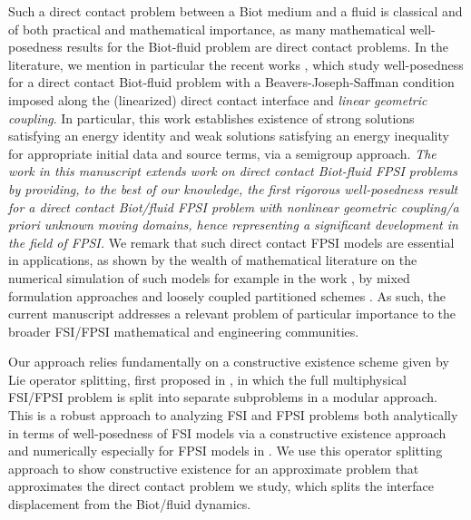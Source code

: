 \documentclass[11pt]{article}
\theoremstyle{definition}
\begin{document}
Such a direct contact problem between a Biot medium and a fluid is classical and of both practical and mathematical importance, as many mathematical well-posedness results for the Biot-fluid problem are direct contact problems. In the literature, we mention in particular the recent works \cite{Gurvich,AW25}, which study well-posedness for a direct contact Biot-fluid problem with a Beavers-Joseph-Saffman condition imposed along the (linearized) direct contact interface and \textit{linear geometric coupling}. In particular, this work establishes existence of strong solutions satisfying an energy identity and weak solutions satisfying an energy inequality for appropriate initial data and source terms, via a semigroup approach. \textit{The work in this manuscript extends work on direct contact Biot-fluid FPSI problems by providing, to the best of our knowledge, the first rigorous well-posedness result for a direct contact Biot/fluid FPSI problem with nonlinear geometric coupling/a priori unknown moving domains, hence representing a significant development in the field of FPSI.} We remark that such direct contact FPSI models are essential in applications, as shown by the wealth of mathematical literature on the numerical simulation of such models for example in the work \cite{QuainiQuarteroniPoroelastic}, by mixed formulation approaches \cite{MixedBiot, MixedBiot2, MixedBiot3, MixedBiot4} and loosely coupled partitioned schemes \cite{BukacBiot, OyekoleBukacFPSI}. As such, the current manuscript addresses a relevant problem of particular importance to the broader FSI/FPSI mathematical and engineering communities.

Our approach relies fundamentally on a constructive existence scheme given by Lie operator splitting, first proposed in \cite{MuhaCanic13}, in which the full multiphysical FSI/FPSI problem is split into separate subproblems in a modular approach. This is a robust approach to analyzing FSI and FPSI problems both analytically in terms of well-posedness of FSI models via a constructive existence approach \cite{MuhaCanic13, BorSun3d, BorSunMultiLayered, BorSunNonLinearKoiter, BorSunSlip, BCMW21, TW20, MMNT22} and numerically especially for FPSI models in \cite{BYZFPSI, BukacBiot, OyekoleBukacFPSI}. We use this operator splitting approach to show constructive existence for an approximate problem that approximates the direct contact problem we study, which splits the interface displacement from the Biot/fluid dynamics.
\end{document}
